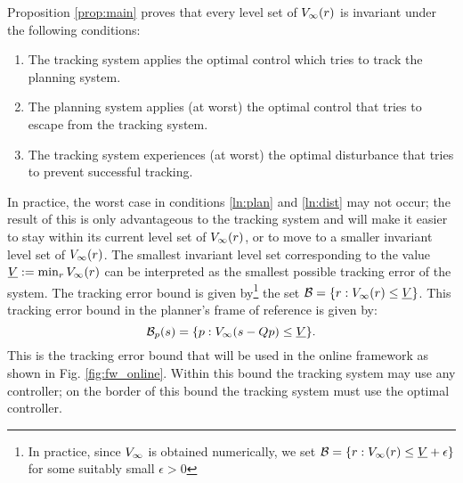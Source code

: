 Proposition \ref{prop:main} proves that every level set of $V_\infty(r)$ is invariant under the following conditions:
\begin{enumerate}
  \item The tracking system applies the optimal control which tries to track the planning system.
  \item The planning system applies (at worst) the optimal control that tries to escape from the tracking system. \label{ln:plan}
  \item The tracking system experiences (at worst) the optimal disturbance that tries to prevent successful tracking. \label{ln:dist}
\end{enumerate}
In practice, the worst case in conditions \ref{ln:plan} and \ref{ln:dist} may not occur; the result of this is only advantageous to the tracking system and will make it easier to stay within its current level set of $V_\infty(r)$, or to move to a smaller invariant level set of $V_\infty(r)$. The smallest invariant level set corresponding to the value $\underline{V} := \min_{r} V_\infty(r)$ can be interpreted as the smallest possible tracking error of the system. The tracking error bound is given by\footnote{In practice, since $V_\infty$ is obtained numerically, we set $\mathcal B = \{r: V_\infty(r) \le \underline{V} + \epsilon\}$ for some suitably small $\epsilon>0$} the set $\mathcal B = \{r: V_\infty(r) \le \underline{V}\}$. This tracking error bound in the planner's frame of reference is given by:
\begin{equation} \label{eq:TEBp}
\mathcal B_p(s) = \{p: V_\infty(s-Qp) \le \underline{V}\}.
\end{equation}
This is the tracking error bound that will be used in the online framework as shown in Fig. \ref{fig:fw_online}. Within this bound the tracking system may use any controller; on the border of this bound the tracking system must use the optimal controller. 

